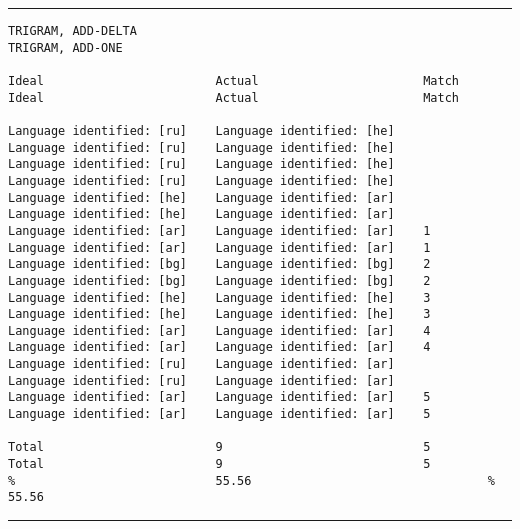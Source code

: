\tiny
\hrule\vskip4pt
\begin{verbatim}
TRIGRAM, ADD-DELTA                                                 TRIGRAM, ADD-ONE

Ideal                        Actual                       Match    Ideal                        Actual                       Match

Language identified: [ru]    Language identified: [he]             Language identified: [ru]    Language identified: [he]
Language identified: [ru]    Language identified: [he]             Language identified: [ru]    Language identified: [he]
Language identified: [he]    Language identified: [ar]             Language identified: [he]    Language identified: [ar]
Language identified: [ar]    Language identified: [ar]    1        Language identified: [ar]    Language identified: [ar]    1
Language identified: [bg]    Language identified: [bg]    2        Language identified: [bg]    Language identified: [bg]    2
Language identified: [he]    Language identified: [he]    3        Language identified: [he]    Language identified: [he]    3
Language identified: [ar]    Language identified: [ar]    4        Language identified: [ar]    Language identified: [ar]    4
Language identified: [ru]    Language identified: [ar]             Language identified: [ru]    Language identified: [ar]
Language identified: [ar]    Language identified: [ar]    5        Language identified: [ar]    Language identified: [ar]    5

Total                        9                            5        Total                        9                            5
%                            55.56                                 %                            55.56
\end{verbatim}
\vskip4pt\hrule


